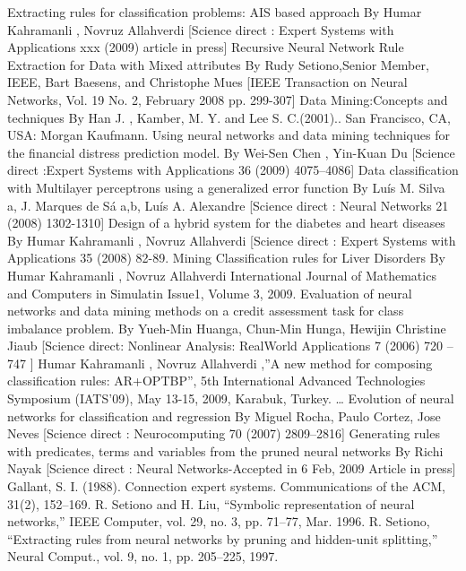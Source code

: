 \documentclass[a4paper,14pt,onecolumn]{article}
\begin{document}
\newpage
\begin{thebibliography}{00}
 Extracting rules for classification problems: AIS based approach By Humar Kahramanli , Novruz Allahverdi [Science direct : Expert Systems with Applications xxx (2009) article in press]
 Recursive Neural Network Rule Extraction for Data with Mixed attributes By Rudy Setiono,Senior Member, IEEE, Bart Baesens, and Christophe Mues [IEEE Transaction on Neural Networks, Vol. 19 No. 2, February 2008 pp. 299-307]
 Data Mining:Concepts and techniques By Han J. , Kamber, M. Y. and Lee S. C.(2001).. San Francisco, CA, USA: Morgan Kaufmann.
 Using neural networks and data mining techniques for the financial distress prediction model. By Wei-Sen Chen , Yin-Kuan Du [Science direct :Expert Systems with Applications 36 (2009) 4075–4086]
 Data classification with Multilayer perceptrons using a generalized error function By Luís M. Silva a, J. Marques de Sá a,b, Luís A. Alexandre [Science direct : Neural Networks 21 (2008) 1302-1310]
 Design of a hybrid system for the diabetes and heart diseases By Humar Kahramanli , Novruz Allahverdi [Science direct : Expert Systems with Applications 35 (2008) 82-89.
 Mining Classification rules for Liver Disorders By Humar Kahramanli , Novruz Allahverdi International Journal of Mathematics and Computers in Simulatin Issue1, Volume 3, 2009.
 Evaluation of neural networks and data mining methods on a credit assessment task for class imbalance problem. By Yueh-Min Huanga, Chun-Min Hunga, Hewijin Christine Jiaub [Science direct: Nonlinear Analysis: RealWorld Applications 7 (2006) 720 – 747 ]
 Humar Kahramanli , Novruz Allahverdi ,”A new method for composing classification rules: AR+OPTBP”, 5th International Advanced Technologies Symposium (IATS’09), May 13-15, 2009, Karabuk, Turkey. …
 Evolution of neural networks for classification and regression By Miguel Rocha, Paulo Cortez, Jose Neves [Science direct : Neurocomputing 70 (2007) 2809–2816]
 Generating rules with predicates, terms and variables from the pruned neural networks By Richi Nayak [Science direct : Neural Networks-Accepted in 6 Feb, 2009 Article in press]
 Gallant, S. I. (1988). Connection expert systems. Communications of the ACM, 31(2), 152–169. 
 R. Setiono and H. Liu, “Symbolic representation of neural networks,” IEEE Computer, vol. 29, no. 3, pp. 71–77, Mar. 1996.
 R. Setiono, “Extracting rules from neural networks by pruning and hidden-unit splitting,” Neural Comput., vol. 9, no. 1, pp. 205–225, 1997.

\end{thebibliography}
\end{document}
